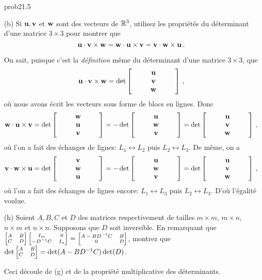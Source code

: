 \bigskip
\begin{sol}{prob21.5}
\medskip
 

(b) Si $\mathbf{u}, \mathbf{v}$ et $\mathbf{w}$ sont des vecteurs de $\mathbb{R}^3$, utilisez les propriétés du déterminant d'une matrice $3\times 3$ pour montrer que 
$$ \mathbf{u}\cdot \mathbf{v}\times \mathbf{w}=  \mathbf{w}\cdot \mathbf{u}\times \mathbf{v}= \mathbf{v}\cdot \mathbf{w}\times \mathbf{u}\,.$$

\soln On sait, puisque c'est la {\it définition} même du déterminant d'une matrice $3\times 3$, que 
$$\uu\cdot \vv\times \ww =\det \bmatrix ~&~&\uu&~&~\\&&\vv\\&&\ww\endbmatrix\,,$$ 
où nous avons écrit les vecteurs sous forme de blocs en lignes. Donc 
$$\ww\cdot \uu\times \vv=\det \bmatrix ~&~&\ww&~&~\\&&\uu\\&&\vv\endbmatrix 
=-\det \bmatrix ~&~&\uu&~&~\\&&\ww\\&&\vv\endbmatrix
=\det \bmatrix ~&~&\uu&~&~\\&&\vv\\&&\ww\endbmatrix\,,$$ 
où l'on a fait des \'echanges de lignes: $L_1
\leftrightarrow L_2$ puis $L_2
\leftrightarrow L_3 $.  De m\^eme, on a 
$$\vv\cdot \ww\times \uu
=  \det \bmatrix ~&~&\vv&~&~\\&&\ww\\&&\uu\endbmatrix 
=- \det\bmatrix ~&~&\uu&~&~\\&&\ww\\&&\vv\endbmatrix
= \det\bmatrix ~&~&\uu&~&~\\&&\vv\\&&\ww\endbmatrix\,,$$ 
où l'on a fait des \'echanges de lignes encore: $L_1
\leftrightarrow L_3$ puis $L_2
\leftrightarrow L_3 $. D'où l'égalité voulue.

\medskip

(h) Soient $A, B, C$ et $D$ des matrices respectivement de tailles $m\times m$,   $m \times n$, $n \times m$ et $n \times n$. Supposons que $D$ soit inversible. En remarquant que $ \scriptsize\bmatrix A&B\\C&D\endbmatrix \bmatrix I_m&0\\-D^{-1}C&I_n\endbmatrix  =\bmatrix A-BD^{-1}C&B\\0&D\endbmatrix$, montrez que $\det \scriptsize\bmatrix A&B\\C&D\endbmatrix= \det (A-BD^{-1}C) \det(D)$.

\soln Ceci découle de (g) et de la propriété multiplicative des déterminants.
\medskip


\end{sol}

